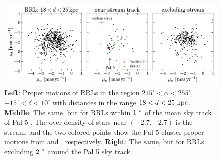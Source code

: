 \documentclass[twocolumn]{aastex63}
\begin{document}


\begin{figure}[th]
\begin{center}
\includegraphics[width=\textwidth]{proper-motion.pdf}
\caption{\textbf{Left}: Proper motions of RRLs in the region $215^\circ < \alpha < 255^\circ$, $-15^\circ < \delta < 10^\circ$ with distances in the range $18 < d < 25~\mathrm{kpc}$.
\textbf{Middle}: The same, but for RRLs within $1~\mbox{$^\circ$}$ of the mean sky track of Pal 5 \citep{Bonaca:2019}.
The over-density of stars near $(-2.7, -2.7)$ is the stream, and the two colored points show the Pal 5 cluster proper motions from \citet{Vasiliev:2019} and \citet{Fritz:2015}, respectively.
\textbf{Right}: The same, but for RRLs excluding $2~\mbox{$^\circ$}$ around the Pal 5 sky track.}
\label{fig:pm}
\end{center}
\end{figure}
\end{document}
